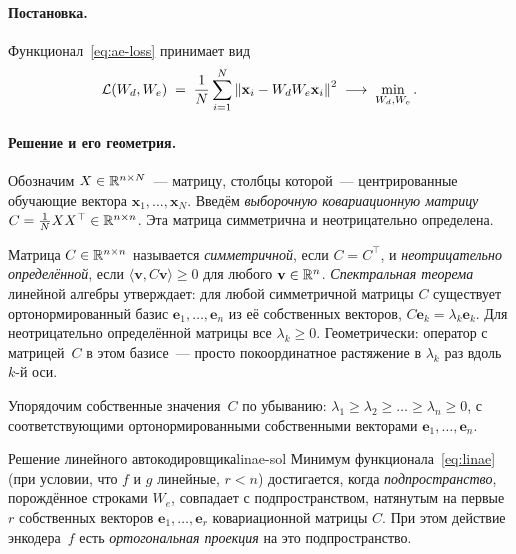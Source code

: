 \paragraph{Постановка.}
Функционал~\eqref{eq:ae-loss} принимает вид
\begin{equation}\label{eq:linae}
\mathcal L(W_d,W_e)\;=\;\frac{1}{N}\sum_{i=1}^{N}\left\|\mathbf x_i-W_d W_e \mathbf x_i\right\|^{2}\;\longrightarrow\;\min_{W_d,W_e}.
\end{equation}

\paragraph{Решение и его геометрия.}
Обозначим $X\in\mathbb{R}^{n\times N}$~--- матрицу, столбцы которой~---
центрированные обучающие вектора $\mathbf x_1,\dots,\mathbf x_N$.
Введём \emph{выборочную ковариационную матрицу} $C=\tfrac{1}{N}X X^{\top}\in\mathbb{R}^{n\times n}$.
Эта матрица симметрична и неотрицательно определена.

\begin{notebox}[title={Симметричные неотрицательно определённые матрицы}]
Матрица $C\in\mathbb{R}^{n\times n}$ называется
\emph{симметричной}, если $C=C^{\top}$, и
\emph{неотрицательно определённой}, если $\langle \mathbf v,C\mathbf v\rangle\geq 0$
для любого $\mathbf v\in\mathbb{R}^{n}$. \emph{Спектральная теорема} линейной
алгебры утверждает: для любой симметричной матрицы $C$ существует
ортонормированный базис $\mathbf e_1,\dots,\mathbf e_n$ из её собственных
векторов, $C\mathbf e_k=\lambda_k\mathbf e_k$. Для неотрицательно
определённой матрицы все $\lambda_k\geq 0$. Геометрически: оператор
с матрицей~$C$ в этом базисе~--- просто покоординатное растяжение в
$\lambda_k$ раз вдоль $k$-й оси.
\end{notebox}

Упорядочим собственные значения~$C$ по убыванию:
$\lambda_1\geq\lambda_2\geq\dots\geq\lambda_n\geq 0$, с соответствующими
ортонормированными собственными векторами $\mathbf e_1,\dots,\mathbf e_n$.

\begin{theorem}{Решение линейного автокодировщика}{linae-sol}
Минимум функционала~\eqref{eq:linae} (при условии, что $f$ и $g$
линейные, $r<n$) достигается, когда \emph{подпространство},
порождённое строками $W_e$, совпадает с подпространством, натянутым на
первые $r$ собственных векторов $\mathbf e_1,\dots,\mathbf e_r$
ковариационной матрицы $C$. При этом действие энкодера~$f$ есть
\emph{ортогональная проекция} на это подпространство.
\end{theorem}

